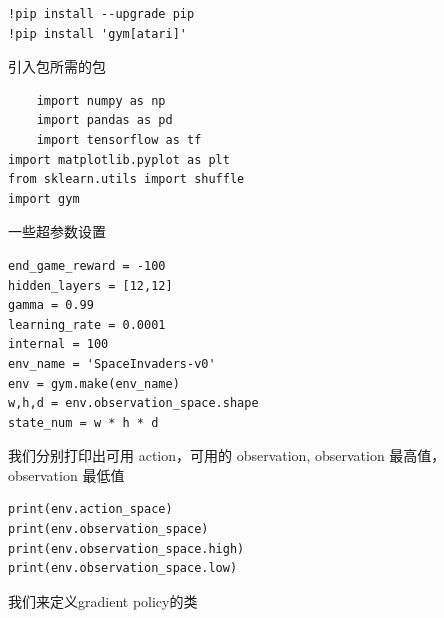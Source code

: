 \documentclass[fontset=windows,openany,UTF8]{ctexbook}
\begin{document}
\lstset{language=python}
\begin{lstlisting}
!pip install --upgrade pip
!pip install 'gym[atari]'
\end{lstlisting}

引入包所需的包

\lstset{language=python}
    \begin{lstlisting}
    import numpy as np
    import pandas as pd
    import tensorflow as tf
import matplotlib.pyplot as plt
from sklearn.utils import shuffle
import gym
\end{lstlisting}

一些超参数设置

\lstset{language=python}
\begin{lstlisting}
end_game_reward = -100
hidden_layers = [12,12]
gamma = 0.99
learning_rate = 0.0001
internal = 100
env_name = 'SpaceInvaders-v0'
env = gym.make(env_name)
w,h,d = env.observation_space.shape
state_num = w * h * d
\end{lstlisting}


我们分别打印出可用 action，可用的 observation, observation 最高值，observation 最低值

\lstset{language=python}
\begin{lstlisting}
print(env.action_space)
print(env.observation_space)
print(env.observation_space.high) 
print(env.observation_space.low)
\end{lstlisting}

我们来定义gradient policy的类
\end{document}

